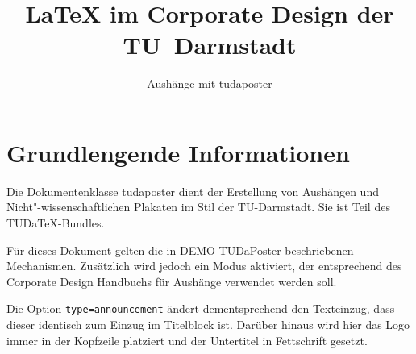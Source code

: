 \documentclass[
	paper=a4,
	ngerman,
	accentcolor=9c,
	footer=true,
	type=announcement,
	fontsize=12pt
	]{tudaposter}
\let\code\texttt
\begin{document}
\title{\LaTeX{} im Corporate Design der TU~Darmstadt}
\subtitle{Aushänge mit tudaposter}



\maketitle

\section*{Grundlengende Informationen}
Die Dokumentenklasse tudaposter dient der Erstellung von Aushängen und Nicht"-wissenschaftlichen Plakaten im Stil der TU-Darmstadt. Sie ist Teil des TUDa\TeX-Bundles.

Für dieses Dokument gelten die in DEMO-TUDaPoster beschriebenen Mechanismen. Zusätzlich wird jedoch ein Modus aktiviert, der entsprechend des Corporate Design Handbuchs für Aushänge verwendet werden soll.

Die Option \code{type=announcement} ändert dementsprechend den Texteinzug, dass dieser identisch zum Einzug im Titelblock ist. Darüber hinaus wird hier das Logo immer in der Kopfzeile platziert und der Untertitel in Fettschrift gesetzt.
\end{document}

